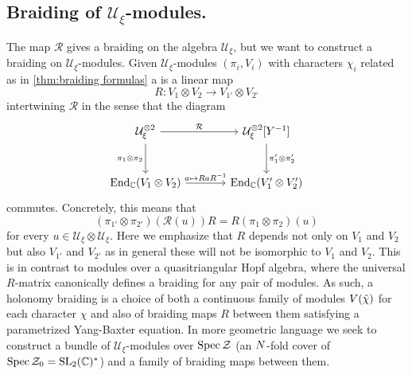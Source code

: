 \documentclass{sl2ams}
\numberwithin{equation}{section}
\newcommand{\CC}{\mathbb{C}}
\newcommand{\Z}{\mathcal{Z}}
\newcommand{\U}{\mathcal{U}}
\newcommand{\R}{\mathcal{R}}
\begin{document}
\subsection{Braiding of \texorpdfstring{$\U_\xi$}{Uξ}-modules.}
The map \(\mathcal{R}\) gives a braiding on  the algebra \(\U_{\xi}\), but we want to construct a braiding on \(\U_{\xi}\)-modules.
Given \(\U_\xi\)-modules \((\pi_{i}, V_{i})\) with characters \(\chi_{i}\) related as in \cref{thm:braiding formulas} a  is a linear map
\[
  R : V_{1} \otimes V_{2} \to V_{1'} \otimes V_{2'}
\]
intertwining \(\R\) in the sense that the diagram 
\begin{equation}
  \label{eq:R-mat-U-module-diagram}
  \begin{tikzcd}[row sep = large, column sep = large]
    \U_\xi^{\otimes 2} \arrow[r, "\R"] \arrow[d, swap, "\pi_{1} \otimes \pi_{2}"] & \U_\xi^{\otimes 2}[Y^{-1}] \arrow[d, "\pi_{1}' \otimes \pi_{2}'"] \\
    \End_\CC(V_1 \otimes V_2) \arrow[r, "a \mapsto R a R^{-1}"] & \End_\CC(V_1' \otimes V_2')
  \end{tikzcd}
\end{equation}
commutes.
Concretely, this means that
\[
  (\pi_{1'} \otimes \pi_{2'})( \R(u) ) R = R  (\pi_{1} \otimes \pi_{2})(u)
\]
for every \(u \in \U_{\xi} \otimes \U_{\xi}\).
Here we emphasize that \(R\) depends not only on \(V_{1}\) and \(V_{2}\) but also \(V_{1'}\) and \(V_{2'}\) as in general these will not be isomorphic to \(V_{1}\) and \(V_{2}\).
This is in contrast to modules over a quasitriangular Hopf algebra, where the universal \(R\)-matrix canonically defines a braiding for any pair of modules.
As such, a holonomy braiding is a choice of both a continuous family of modules \(V\mathopen{}\left(\hat{\chi}\right)\) for each character \(\hat{\chi}\) and also of braiding maps \(R\) between them satisfying a parametrized Yang-Baxter equation.
In more geometric language we seek to construct a bundle of \(\U_{\xi}\)-modules over \(\spec \Z\) (an \(N\)-fold cover of \(\spec \Z_{0} = \slg^*\)) and a family of braiding maps between them.
\end{document}
